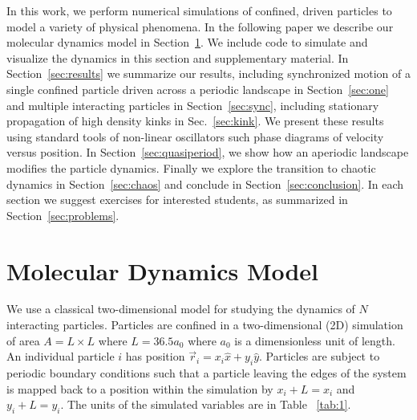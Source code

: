 \documentclass[twocolumn,preprintnumbers,amsmath,amssymb,aps,prx]{revtex4}
\begin{document}
In this work,
we perform 
numerical simulations of confined, driven particles
to model a variety of physical phenomena.
In the following paper we describe
our molecular dynamics model in Section~\ref{sec:MD}.
We include code to simulate
and visualize the dynamics in this section
and supplementary material.
In Section~\ref{sec:results} we summarize
our results,
including synchronized motion of a single confined particle
driven across a periodic landscape in 
Section~\ref{sec:one} and
multiple interacting particles
in Section~\ref{sec:sync},
including stationary propagation of high density kinks
in Sec.~\ref{sec:kink}.
We present these results using standard tools of non-linear oscillators
such phase diagrams of velocity versus position.
In Section~\ref{sec:quasiperiod},
we show how an aperiodic landscape modifies the particle dynamics.
Finally we explore the transition to chaotic dynamics in 
Section~\ref{sec:chaos}
and conclude 
in Section~\ref{sec:conclusion}. 
In each section
we suggest exercises for interested students,
as summarized in Section~\ref{sec:problems}.



\section{Molecular Dynamics Model}
\label{sec:MD}
We use a classical two-dimensional model for 
studying the dynamics of $N$ interacting particles. 
Particles are confined in a two-dimensional (2D) 
simulation of area $A = L \times L$ where $L=36.5 a_0$
where $a_0$ is a dimensionless unit of length.
An individual particle $i$ has
position $\vec{r}_i = x_i \hat{x} + y_i \hat{y}$.
Particles are subject to
periodic boundary conditions
such that a particle leaving the edges of the system is mapped
back to a position within the simulation 
by $x_i+L=x_i$ and $y_i+L=y_i$.
The units of the simulated variables are in Table ~\ref{tab:1}.
\end{document}
